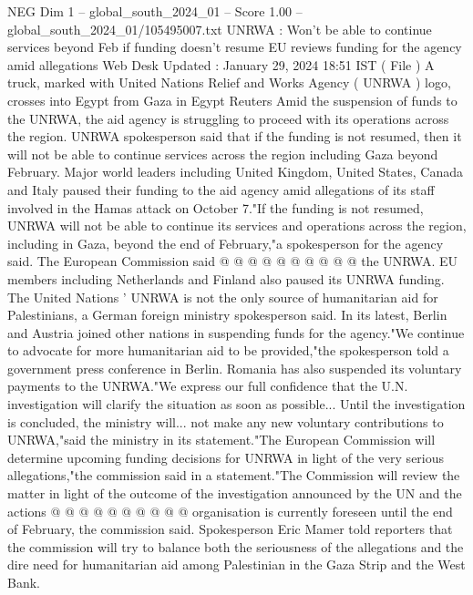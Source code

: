 \begin{textsample}{NEG Dim 1 – global\_south\_2024\_01 – Score 1.00 – global\_south\_2024\_01/105495007.txt}  \label{ex:f1_neg_350}
UNRWA : Won't be able to continue services beyond Feb if funding doesn't resume EU reviews funding for the agency amid allegations Web Desk Updated : January 29, 2024 18:51 IST ( File ) A truck, marked with United Nations Relief and Works Agency ( UNRWA ) logo, crosses into Egypt from Gaza in Egypt Reuters Amid the suspension of funds to the UNRWA, the aid agency is struggling to proceed with its operations across the region.
UNRWA spokesperson said that if the funding is not resumed, then it will not be able to continue services across the region including Gaza beyond February.
Major world leaders including United Kingdom, United States, Canada and Italy paused their funding to the aid agency amid allegations of its staff involved in the Hamas attack on October 7."If the funding is not resumed, UNRWA will not be able to continue its services and operations across the region, including in Gaza, beyond the end of February,"a spokesperson for the agency said.
The European Commission said @ @ @ @ @ @ @ @ @ @ the UNRWA.
EU members including Netherlands and Finland also paused its UNRWA funding.
The United Nations ' UNRWA is not the only source of humanitarian aid for Palestinians, a German foreign ministry spokesperson said.
In its latest, Berlin and Austria joined other nations in suspending funds for the agency."We continue to advocate for more humanitarian aid to be provided,"the spokesperson told a government press conference in Berlin.
Romania has also suspended its voluntary payments to the UNRWA."We express our full confidence that the U.N. investigation will clarify the situation as soon as possible...
Until the investigation is concluded, the ministry will... not make any new voluntary contributions to UNRWA,"said the ministry in its statement."The European Commission will determine upcoming funding decisions for UNRWA in light of the very serious allegations,"the commission said in a statement."The Commission will review the matter in light of the outcome of the investigation announced by the UN and the actions @ @ @ @ @ @ @ @ @ @ organisation is currently foreseen until the end of February, the commission said.
Spokesperson Eric Mamer told reporters that the commission will try to balance both the seriousness of the allegations and the dire need for humanitarian aid among Palestinian in the Gaza Strip and the West Bank.

\end{textsample}
